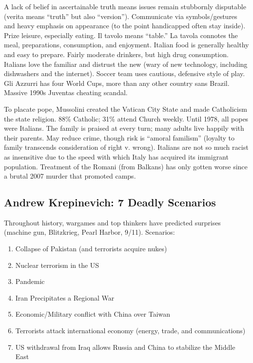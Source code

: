 \documentclass[
]{article}
\begin{document}
A lack of belief in ascertainable truth means issues remain stubbornly
disputable (verita means ``truth'' but also ``version''). Communicate
via symbols/gestures and heavy emphasis on appearance (to the point
handicapped often stay inside). Prize leisure, especially eating. Il
tavolo means ``table.'' La tavola connotes the meal, preparations,
consumption, and enjoyment. Italian food is generally healthy and easy
to prepare. Fairly moderate drinkers, but high drug consumption.
Italians love the familiar and distrust the new (wary of new technology,
including dishwashers and the internet). Soccer team uses cautious,
defensive style of play. Gli Azzurri has four World Cups, more than any
other country sans Brazil. Massive 1990s Juventas cheating scandal.

To placate pope, Mussolini created the Vatican City State and made
Catholicism the state religion. 88\% Catholic; 31\% attend Church
weekly. Until 1978, all popes were Italians. The family is praised at
every turn; many adults live happily with their parents. May reduce
crime, though risk is ``amoral familism'' (loyalty to family transcends
consideration of right v. wrong). Italians are not so much racist as
insensitive due to the speed with which Italy has acquired its immigrant
population. Treatment of the Romani (from Balkans) has only gotten worse
since a brutal 2007 murder that promoted camps.

\hypertarget{andrew-krepinevich-7-deadly-scenarios}{%
\subsection{Andrew Krepinevich: 7 Deadly
Scenarios}\label{andrew-krepinevich-7-deadly-scenarios}}

Throughout history, wargames and top thinkers have predicted surprises
(machine gun, Blitzkrieg, Pearl Harbor, 9/11). Scenarios:

\begin{enumerate}
\def\labelenumi{\arabic{enumi}.}
\item
  Collapse of Pakistan (and terrorists acquire nukes)
\item
  Nuclear terrorism in the US
\item
  Pandemic
\item
  Iran Precipitates a Regional War
\item
  Economic/Military conflict with China over Taiwan
\item
  Terrorists attack international economy (energy, trade, and
  communications)
\item
  US withdrawal from Iraq allows Russia and China to stabilize the
  Middle East
\end{enumerate}
\end{document}
